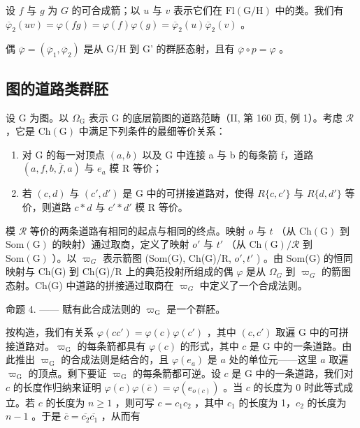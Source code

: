 设 \(f\) 与 \(g\) 为 \(G\) 的可合成箭；以 \(u\) 与 \(v\) 表示它们在 \(\mathrm{Fl}(\mathrm{G} / \mathrm{H})\) 中的类。我们有 \(\overline{\varphi}_2(uv) = \varphi(fg) = \varphi(f)\varphi(g) = \overline{\varphi}_2(u)\overline{\varphi}_2(v)\) 。

偶 \(\overline{\varphi} = (\overline{\varphi}_1, \overline{\varphi}_2)\) 是从 G/H 到 G' 的群胚态射，且有 \(\overline{\varphi} \circ p = \varphi\) 。

\subsection{图的道路类群胚}

设 G 为图。以 \(\Omega_{\mathrm{G}}\) 表示 G 的底层箭图的道路范畴（II, 第 160 页, 例 1）。考虑 \(\mathcal{R}\) ，它是 \(\mathrm{Ch(G)}\) 中满足下列条件的最细等价关系：

\begin{enumerate}
\def\labelenumi{(\roman{enumi})}
\item
  对 G 的每一对顶点 \((a,b)\) 以及 G 中连接 a 与 b 的每条箭 f，道路 \((a,f,b,\overline{f},a)\) 与 \(e_{a}\) 模 R 等价；
\item
  若 \((c,d)\) 与 \((c',d')\) 是 G 中的可拼接道路对，使得 \(R\{c,c'\}\) 与 \(R\{d,d'\}\) 等价，则道路 \(c*d\) 与 \(c'*d'\) 模 R 等价。
\end{enumerate}

模 \(\mathcal{R}\) 等价的两条道路有相同的起点与相同的终点。映射 \(o\) 与 \(t\) （从 \(\mathrm{Ch(G)}\) 到 \(\mathrm{Som(G)}\) 的映射）通过取商，定义了映射 \(o'\) 与 \(t'\) （从 \(\mathrm{Ch(G)/\mathcal{R}}\) 到 \(\mathrm{Som(G)}\) ）。以 \(\varpi_{G}\) 表示箭图 (Som(G), Ch(G)/R, \(o', t'\) ) 。由 Som(G) 的恒同映射与 Ch(G) 到 Ch(G)/R 上的典范投射所组成的偶 \(\varphi\) 是从 \(\Omega_{G}\) 到 \(\varpi_{G}\) 的箭图态射。Ch(G) 中道路的拼接通过取商在 \(\varpi_{G}\) 中定义了一个合成法则。

命题 4. —— 赋有此合成法则的 \(\varpi_{\mathrm{G}}\) 是一个群胚。

按构造，我们有关系 \(\varphi(cc') = \varphi(c)\varphi(c')\) ，其中 \((c,c')\) 取遍 G 中的可拼接道路对。\(\varpi_{\mathrm{G}}\) 的每条箭都具有 \(\varphi(c)\) 的形式，其中 \(c\) 是 G 中的一条道路。由此推出 \(\varpi_{\mathrm{G}}\) 的合成法则是结合的，且 \(\varphi(e_a)\) 是 \(a\) 处的单位元——这里 \(a\) 取遍 \(\varpi_{\mathrm{G}}\) 的顶点。剩下要证 \(\varpi_{\mathrm{G}}\) 的每条箭都可逆。设 \(c\) 是 G 中的一条道路，我们对 \(c\) 的长度作归纳来证明 \(\varphi(c)\varphi(\overline{c}) = \varphi(e_{o(c)})\) 。当 \(c\) 的长度为 0 时此等式成立。若 \(c\) 的长度为 \(n \geqslant 1\) ，则可写 \(c = c_1c_2\) ，其中 \(c_1\) 的长度为 1，\(c_2\) 的长度为 \(n - 1\) 。于是 \(\overline{c} = \overline{c_2}\overline{c_1}\) ，从而有

